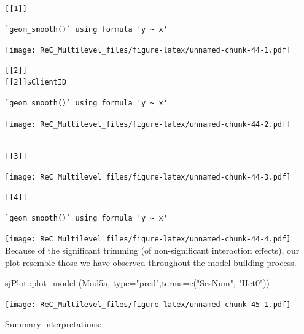 \documentclass[
  english,
]{book}
\newenvironment{Shaded}{\begin{snugshade}}{\end{snugshade}}
\newcommand{\AttributeTok}[1]{\textcolor[rgb]{0.77,0.63,0.00}{#1}}
\newcommand{\FunctionTok}[1]{\textcolor[rgb]{0.00,0.00,0.00}{#1}}
\newcommand{\NormalTok}[1]{#1}
\newcommand{\SpecialCharTok}[1]{\textcolor[rgb]{0.00,0.00,0.00}{#1}}
\newcommand{\StringTok}[1]{\textcolor[rgb]{0.31,0.60,0.02}{#1}}
\begin{document}
\begin{verbatim}
[[1]]
\end{verbatim}

\begin{verbatim}
`geom_smooth()` using formula 'y ~ x'
\end{verbatim}

\texttt{[image: ReC\_Multilevel\_files/figure-latex/unnamed-chunk-44-1.pdf]}

\begin{verbatim}
[[2]]
[[2]]$ClientID
\end{verbatim}

\begin{verbatim}
`geom_smooth()` using formula 'y ~ x'
\end{verbatim}

\texttt{[image: ReC\_Multilevel\_files/figure-latex/unnamed-chunk-44-2.pdf]}

\begin{verbatim}

[[3]]
\end{verbatim}

\texttt{[image: ReC\_Multilevel\_files/figure-latex/unnamed-chunk-44-3.pdf]}

\begin{verbatim}
[[4]]
\end{verbatim}

\begin{verbatim}
`geom_smooth()` using formula 'y ~ x'
\end{verbatim}

\texttt{[image: ReC\_Multilevel\_files/figure-latex/unnamed-chunk-44-4.pdf]}
Because of the significant trimming (of non-significant interaction effects), our plot resemble those we have observed throughout the model building process.

\begin{Shaded}
\begin{Highlighting}[]
\NormalTok{sjPlot}\SpecialCharTok{::}\FunctionTok{plot\_model}\NormalTok{ (Mod5a, }\AttributeTok{type=}\StringTok{"pred"}\NormalTok{,}\AttributeTok{terms=}\FunctionTok{c}\NormalTok{(}\StringTok{"SesNum"}\NormalTok{, }\StringTok{"Het0"}\NormalTok{))}
\end{Highlighting}
\end{Shaded}

\texttt{[image: ReC\_Multilevel\_files/figure-latex/unnamed-chunk-45-1.pdf]}

Summary interpretations:
\end{document}
